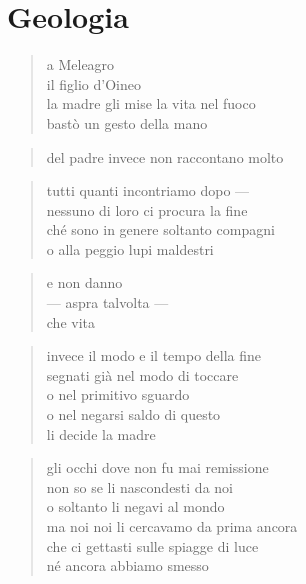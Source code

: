 \chapter*{Geologia}


\begin{verse}
    a Meleagro\\
    il figlio d'Oineo\\
    la madre gli mise la vita nel fuoco\\
    bastò un gesto della mano
\end{verse}

\begin{verse}
    del padre invece non raccontano molto
\end{verse}

\clearpage


\begin{verse}
    tutti quanti incontriamo dopo —\\
    nessuno di loro ci procura la fine\\
    ché sono in genere soltanto compagni\\
    o alla peggio lupi maldestri
\end{verse}

\begin{verse}
    e non danno\\
    — aspra talvolta —\\
    che vita
\end{verse}

\begin{verse}
    invece il modo e il tempo della fine\\
    segnati già nel modo di toccare\\
    o nel primitivo sguardo\\
    o nel negarsi saldo di questo\\
    li decide la madre
\end{verse}

\clearpage


\begin{verse}
    gli occhi dove non fu mai remissione\\
    non so se li nascondesti da noi\\
    o soltanto li negavi al mondo\\
    ma noi noi li cercavamo da prima ancora\\
    che ci gettasti sulle spiagge di luce\\
    né ancora abbiamo smesso
\end{verse}

